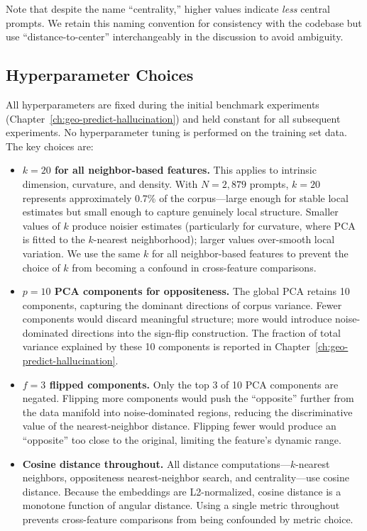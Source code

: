 Note that despite the name ``centrality,'' higher values indicate \emph{less} central prompts. We retain this naming convention for consistency with the codebase but use ``distance-to-center'' interchangeably in the discussion to avoid ambiguity.

\subsection{Hyperparameter Choices}
\label{sec:hyperparameters}

All hyperparameters are fixed during the initial benchmark experiments (Chapter~\ref{ch:geo-predict-hallucination}) and held constant for all subsequent experiments. No hyperparameter tuning is performed on the training set data. The key choices are:

\begin{itemize}
    \item \textbf{$k = 20$ for all neighbor-based features.} This applies to intrinsic dimension, curvature, and density. With $N = 2{,}879$ prompts, $k = 20$ represents approximately 0.7\% of the corpus---large enough for stable local estimates but small enough to capture genuinely local structure. Smaller values of $k$ produce noisier estimates (particularly for curvature, where PCA is fitted to the $k$-nearest neighborhood); larger values over-smooth local variation. We use the same $k$ for all neighbor-based features to prevent the choice of $k$ from becoming a confound in cross-feature comparisons.
    \item \textbf{$p = 10$ PCA components for oppositeness.} The global PCA retains 10 components, capturing the dominant directions of corpus variance. Fewer components would discard meaningful structure; more would introduce noise-dominated directions into the sign-flip construction. The fraction of total variance explained by these 10 components is reported in Chapter~\ref{ch:geo-predict-hallucination}.
    \item \textbf{$f = 3$ flipped components.} Only the top 3 of 10 PCA components are negated. Flipping more components would push the ``opposite'' further from the data manifold into noise-dominated regions, reducing the discriminative value of the nearest-neighbor distance. Flipping fewer would produce an ``opposite'' too close to the original, limiting the feature's dynamic range.
    \item \textbf{Cosine distance throughout.} All distance computations---$k$-nearest neighbors, oppositeness nearest-neighbor search, and centrality---use cosine distance. Because the embeddings are L2-normalized, cosine distance is a monotone function of angular distance. Using a single metric throughout prevents cross-feature comparisons from being confounded by metric choice.
\end{itemize}

